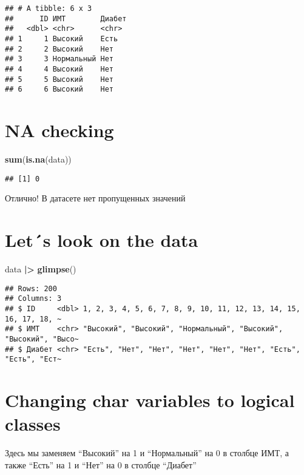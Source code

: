 \documentclass[
]{article}
\newenvironment{Shaded}{\begin{snugshade}}{\end{snugshade}}
\newcommand{\FunctionTok}[1]{\textcolor[rgb]{0.13,0.29,0.53}{\textbf{#1}}}
\newcommand{\NormalTok}[1]{#1}
\newcommand{\SpecialCharTok}[1]{\textcolor[rgb]{0.81,0.36,0.00}{\textbf{#1}}}
\begin{document}
\begin{verbatim}
## # A tibble: 6 x 3
##      ID ИМТ        Диабет
##   <dbl> <chr>      <chr> 
## 1     1 Высокий    Есть  
## 2     2 Высокий    Нет   
## 3     3 Нормальный Нет   
## 4     4 Высокий    Нет   
## 5     5 Высокий    Нет   
## 6     6 Высокий    Нет
\end{verbatim}

\section{NA checking}\label{na-checking}

\begin{Shaded}
\begin{Highlighting}[]
\FunctionTok{sum}\NormalTok{(}\FunctionTok{is.na}\NormalTok{(data))}
\end{Highlighting}
\end{Shaded}

\begin{verbatim}
## [1] 0
\end{verbatim}

Отлично! В датасете нет пропущенных значений

\section{Let´s look on the data}\label{lets-look-on-the-data}

\begin{Shaded}
\begin{Highlighting}[]
\NormalTok{data }\SpecialCharTok{|\textgreater{}} \FunctionTok{glimpse}\NormalTok{()}
\end{Highlighting}
\end{Shaded}

\begin{verbatim}
## Rows: 200
## Columns: 3
## $ ID     <dbl> 1, 2, 3, 4, 5, 6, 7, 8, 9, 10, 11, 12, 13, 14, 15, 16, 17, 18, ~
## $ ИМТ    <chr> "Высокий", "Высокий", "Нормальный", "Высокий", "Высокий", "Высо~
## $ Диабет <chr> "Есть", "Нет", "Нет", "Нет", "Нет", "Нет", "Есть", "Есть", "Ест~
\end{verbatim}

\section{Changing char variables to logical
classes}\label{changing-char-variables-to-logical-classes}

Здесь мы заменяем ``Высокий'' на 1 и ``Нормальный'' на 0 в столбце ИМТ,
а также ``Есть'' на 1 и ``Нет'' на 0 в столбце ``Диабет''
\end{document}
